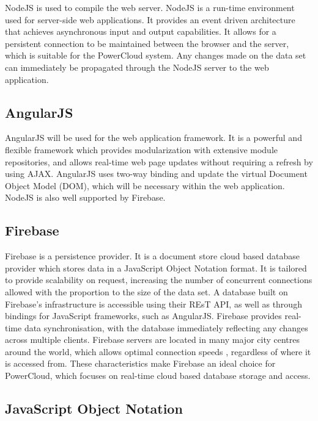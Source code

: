 \documentclass{article}
\begin{document}
	NodeJS is used to compile the web server. NodeJS is a run-time 
	environment used for server-side web applications. It provides an 
	event driven architecture that achieves asynchronous input and output 
	capabilities. It allows for a  persistent connection to be maintained 
	between the browser and the server, which is suitable for the 
	PowerCloud system. Any changes made on the data set can immediately 
	be propagated through the NodeJS server to the web application.
	
	\subsection{AngularJS}
	
	AngularJS will be used for the web application framework. It is a 
	powerful and flexible framework which provides modularization with 
	extensive module repositories, and allows real-time web page updates 
	without requiring a refresh by using AJAX. AngularJS uses two-way 
	binding and update the virtual Document Object Model (DOM), which 
	will be necessary within the web application. NodeJS is also well 
	supported by Firebase.
	
	\subsection{Firebase}
	
	Firebase is a persistence provider. It is a document store cloud 
	based database provider which stores data in a JavaScript Object 
	Notation format. It is tailored to provide scalability on request, 
	increasing the number of concurrent connections allowed with the 
	proportion to the size of the data set. A database built on 
	Firebase's infrastructure is accessible using their REsT API, as well 
	as through bindings for JavaScript frameworks, such as AngularJS. 
	Firebase provides real-time data synchronisation, with the database 
	immediately reflecting any changes across multiple clients. Firebase 
	servers are located in many major city centres around the world, 
	which allows optimal connection speeds , regardless of where it is 
	accessed from. These characteristics make Firebase an ideal choice 
	for PowerCloud, which focuses on real-time cloud based database 
	storage and access.
	
	\subsection{JavaScript Object Notation}
	
\end{document}
